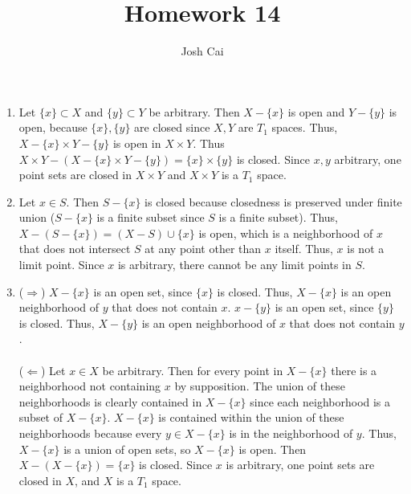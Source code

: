 \documentclass{article}
\begin{document}
\title{Homework 14}
\author{Josh Cai}

\maketitle
\begin{enumerate}
\item
Let $\{x\} \subset X$ and $\{y\} \subset Y$ be arbitrary. Then $X-\{x\}$ is open and $Y-\{y\}$ is open, because $\{x\}, \{y\}$ are closed since $X, Y$ are $T_1$ spaces. Thus, $X-\{x\} \times Y-\{y\}$ is open in $X \times Y$. Thus $X \times Y - (X-\{x\} \times Y-\{y\}) = \{x\} \times \{y\}$ is closed. Since $x, y$ arbitrary, one point sets are closed in $X \times Y$ and $X\times Y$ is a $T_1$ space.

\item 
Let $x\in S$. Then $S - \{x\}$ is closed because closedness is preserved under finite union ($S - \{x\}$ is a finite subset since $S$ is a finite subset). Thus, $X - (S - \{x\}) = (X-S) \cup \{x\}$ is open, which is a neighborhood of $x$ that does not intersect $S$ at any point other than $x$ itself. Thus, $x$ is not a limit point. Since $x$ is arbitrary, there cannot be any limit points in $S$.

\item
($\Rightarrow$) $X-\{x\}$ is an open set, since $\{x\}$ is closed. Thus, $X-\{x\}$ is an open neighborhood of $y$ that does not contain $x$. $x-\{y\}$ is an open set, since $\{y\}$ is closed. Thus, $X-\{y\}$ is an open neighborhood of $x$ that does not contain $y$.
\\\\($\Leftarrow$) Let $x \in X$ be arbitrary. Then for every point in $X-\{x\}$ there is a neighborhood not containing $x$ by supposition. The union of these neighborhoods is clearly contained in $X-\{x\}$ since each neighborhood is a subset of $X-\{x\}$. $X-\{x\}$ is contained within the union of these neighborhoods because every $y \in X-\{x\}$ is in the neighborhood of $y$. Thus, $X-\{x\}$ is a union of open sets, so $X-\{x\}$ is open. Then $X - (X-\{x\}) = \{x\}$ is closed. Since $x$ is arbitrary, one point sets are closed in $X$, and $X$ is a $T_1$ space.


\end{enumerate}
\end{document}
